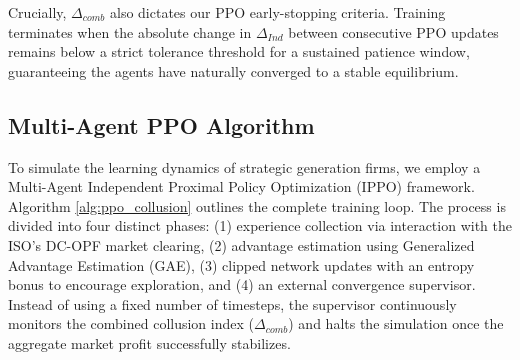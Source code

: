 \documentclass[lettersize,journal]{IEEEtran}
\begin{document}
Crucially, $\Delta_{comb}$ also dictates our PPO early-stopping criteria. Training terminates when the absolute change in $\Delta_{Ind}$ between consecutive PPO updates remains below a strict tolerance threshold for a sustained patience window, guaranteeing the agents have naturally converged to a stable equilibrium.

\subsection{Multi-Agent PPO Algorithm}
To simulate the learning dynamics of strategic generation firms, we employ a Multi-Agent Independent Proximal Policy Optimization (IPPO) framework. Algorithm \ref{alg:ppo_collusion} outlines the complete training loop. The process is divided into four distinct phases: (1) experience collection via interaction with the ISO's DC-OPF market clearing, (2) advantage estimation using Generalized Advantage Estimation (GAE), (3) clipped network updates with an entropy bonus to encourage exploration, and (4) an external convergence supervisor. Instead of using a fixed number of timesteps, the supervisor continuously monitors the combined collusion index ($\Delta_{comb}$) and halts the simulation once the aggregate market profit successfully stabilizes.
\end{document}
